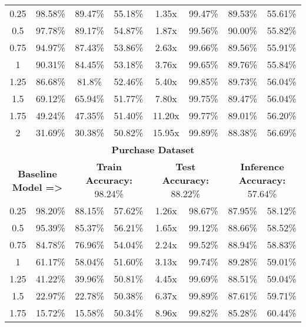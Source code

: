 \begin{table*}[!htb]
\begin{center}
\begin{tabular}{|c|c|c|c|c|c|c|c|}
\hline
0.25 & 98.58\% & 89.47\% & \cellcolor{green!25}55.18\% & 1.35x & 99.47\% & 89.53\% & \cellcolor{red!25}55.61\%\\
0.5 & 97.78\% & 89.17\% & \cellcolor{green!25}54.87\% & 1.87x & 99.56\% & 90.00\% & \cellcolor{red!25}55.82\%\\
0.75 & 94.97\% & 87.43\% & \cellcolor{green!25}53.86\% & 2.63x & 99.66\% & 89.56\% & \cellcolor{red!25}55.91\%\\
1 & 90.31\% & 84.45\% & \cellcolor{green!25}53.18\% & 3.76x & 99.65\% & 89.76\% & \cellcolor{red!25}55.84\%\\
1.25 & 86.68\% & 81.8\% & \cellcolor{green!25}52.46\% & 5.40x & 99.85\% & 89.73\% & \cellcolor{red!25}56.04\%\\
1.5 & 69.12\% & 65.94\% & \cellcolor{green!25}51.77\% & 7.80x & 99.75\% & 89.47\% & \cellcolor{red!25}56.04\%\\
1.75 & 49.24\% & 47.35\% & \cellcolor{green!25}51.40\% & 11.20x & 99.77\% & 89.01\% & \cellcolor{red!25}56.20\%\\
2 & 31.69\% & 30.38\% & \cellcolor{green!25}50.82\% & 15.95x & 99.89\% & 88.38\% & \cellcolor{red!25}56.69\%\\
\hline
\hline
\multicolumn{8}{|c|}{\textbf{Purchase Dataset}}\\
\multicolumn{2}{|c}{\textbf{Baseline Model =>}} & \multicolumn{2}{c}{\textbf{Train Accuracy:} 98.24\%} & \multicolumn{2}{c}{\textbf{Test Accuracy:} 88.22\%} & \multicolumn{2}{c|}{\textbf{Inference Accuracy:} 57.64\%}\\
\hline
0.25 & 98.20\% & 88.15\% & \cellcolor{green!25}57.62\% & 1.26x & 98.67\% & 87.95\% & \cellcolor{red!25}58.12\%\\
0.5 & 95.39\% & 85.37\% & \cellcolor{green!25}56.21\% & 1.65x & 99.12\% & 88.66\% & \cellcolor{red!25}58.52\%\\
0.75 & 84.78\% & 76.96\% & \cellcolor{green!25}54.04\% & 2.24x & 99.52\% & 88.94\% & \cellcolor{red!25}58.83\%\\
1 & 61.17\% & 58.04\% & \cellcolor{green!25}51.60\% & 3.13x & 99.74\% & 89.28\% & \cellcolor{red!25}59.01\%\\
1.25 & 41.22\% & 39.96\% & \cellcolor{green!25}50.81\% & 4.45x & 99.69\% & 88.51\% & \cellcolor{red!25}59.04\%\\
1.5 & 22.97\% & 22.78\% & \cellcolor{green!25}50.38\% & 6.37x & 99.89\% & 87.61\% & \cellcolor{red!25}59.71\%\\
1.75 & 15.72\% & 15.58\% & \cellcolor{green!25}50.34\% & 8.96x & 99.82\% & 85.28\% & \cellcolor{red!25}60.44\%\\

\end{tabular}
\end{center}
\end{table*}

